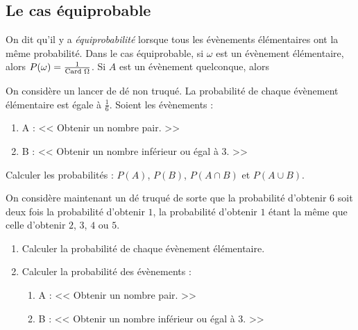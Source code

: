       \subsection*{Le cas \'equiprobable}
            On dit qu'il y a \emph{\'equiprobabilit\'e} lorsque tous les \'ev\`enements 
            \'el\'ementaires ont la m\^eme probabilit\'e.
            Dans le cas \'equiprobable, si $\omega$ est un \'ev\`enement \'el\'ementaire, alors
                  $P(\omega) = \frac{1}{\text{Card }\Omega}$.
            Si $A$ est un \'ev\`enement quelconque, alors 
            \begin{exe}
                        On consid\`ere un lancer de d\'e non truqu\'e.
                        La probabilit\'e de chaque \'ev\`enement \'el\'ementaire est \'egale \`a $\frac{1}{6}$.
                        Soient les \'ev\`enements : 
                              \begin{enumerate}
                                    \item A : << Obtenir un nombre pair. >>
                                    \item B : << Obtenir un nombre inf\'erieur ou \'egal \`a 3. >>
                              \end{enumerate}
                        Calculer les probabilit\'es : $P(A)$, $P(B)$, $P(A\cap B)$ et $P(A \cup B)$.
            \end{exe}
            \begin{exe}
                        On consid\`ere maintenant un d\'e truqu\'e de sorte que 
                              la probabilit\'e d'obtenir $6$ soit deux fois la probabilit\'e d'obtenir $1$,
                              la probabilit\'e d'obtenir $1$ \'etant la m\^eme que celle d'obtenir $2$, $3$, $4$ ou $5$.
                              \begin{enumerate}
                                    \item Calculer la probabilit\'e de chaque \'ev\`enement \'el\'ementaire.
                                    \item Calculer la probabilit\'e des \'ev\`enements :
                                          \begin{enumerate}
                                                \item A : << Obtenir un nombre pair. >>
                                                \item B : << Obtenir un nombre inf\'erieur ou \'egal \`a 3. >>
                                          \end{enumerate}
                              \end{enumerate}
            \end{exe}
